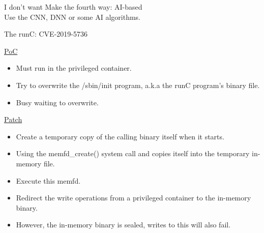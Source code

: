 \documentclass{beamer}
\begin{document}
\begin{CJK*}{UTF8}{bsmi}
  \begin{frame}{I don't want}
    Make the fourth way: AI-based\\
    Use the CNN, DNN or some AI algorithms.
  \end{frame}

  \begin{frame}{The runC: CVE-2019-5736}

    \begin{multicols*}{2}
      \begin{beamerboxesrounded}[width=.5\textwidth]{\href{https://github.com/Frichetten/CVE-2019-5736-PoC/blob/master/main.go}{PoC}}
        \begin{itemize}
          \item Must run in the privileged container.
          \item Try to overwrite the /sbin/init program, a.k.a the runC program's binary file.
          \item Busy waiting to overwrite.
        \end{itemize}
      \end{beamerboxesrounded}

      \begin{beamerboxesrounded}[width=.5\textwidth]{\href{https://github.com/lxc/lxc/commit/6400238d08cdf1ca20d49bafb85f4e224348bf9d}{Patch}}
        \begin{itemize}
          \item Create a temporary copy of the calling binary itself when it starts.
          \item Using the memfd\_create() system call and copies itself into the temporary in-memory file.
          \item Execute this memfd.
          \item Redirect the write operations from a privileged container to the in-memory binary.
          \item However, the in-memory binary is sealed, writes to this will also fail.
        \end{itemize}
      \end{beamerboxesrounded}
    \end{multicols*}

  \end{frame}


\end{CJK*}
\end{document}
